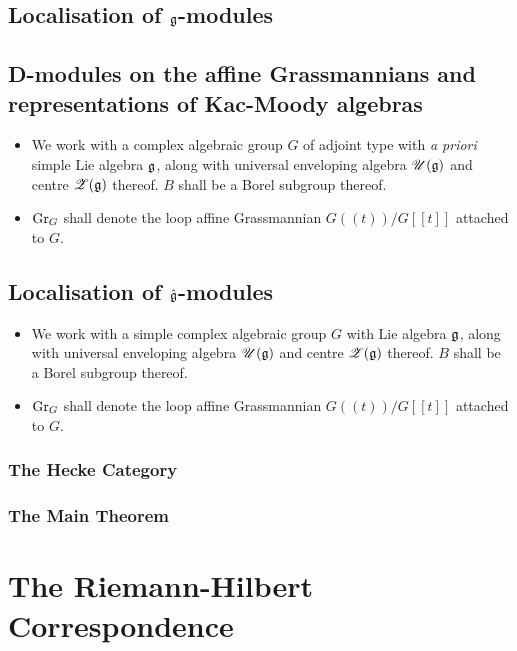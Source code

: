         \subsection{Localisation of \texorpdfstring{$\mathfrak{g}$}{}-modules}
        
        \subsection{D-modules on the affine Grassmannians and representations of Kac-Moody algebras}
            \begin{convention}
                \noindent
                \begin{itemize}
                    \item We work with a complex algebraic group $G$ of adjoint type with \textit{a priori} simple Lie algebra $\mathfrak{g}$, along with universal enveloping algebra $\mathscr{U}(\mathfrak{g})$ and centre $\mathscr{Z}(\mathfrak{g})$ thereof. $B$ shall be a Borel subgroup thereof. 
                    \item $\mathrm{Gr}_G$ shall denote the loop affine Grassmannian $G(\!(t)\!)/G[\![t]\!]$ attached to $G$.
                \end{itemize}
            \end{convention}
            
        \subsection{Localisation of \texorpdfstring{$\hat{\mathfrak{g}}$}{}-modules}
            \begin{convention}
                \noindent
                \begin{itemize}
                    \item We work with a simple complex algebraic group $G$ with Lie algebra $\mathfrak{g}$, along with universal enveloping algebra $\mathscr{U}(\mathfrak{g})$ and centre $\mathscr{Z}(\mathfrak{g})$ thereof. $B$ shall be a Borel subgroup thereof. 
                    \item $\mathrm{Gr}_G$ shall denote the loop affine Grassmannian $G(\!(t)\!)/G[\![t]\!]$ attached to $G$.
                \end{itemize}
            \end{convention}
            
            \subsubsection{The Hecke Category}
            
            \subsubsection{The Main Theorem}
            
    \section{The Riemann-Hilbert Correspondence}